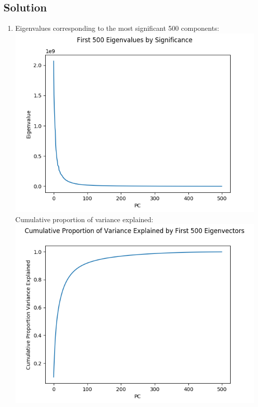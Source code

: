 \documentclass[submit]{harvardml}
\begin{document}
\subsection*{Solution}
\begin{enumerate}
    \item Eigenvalues corresponding to the most significant 500 components:\newline
    \includegraphics[scale=0.5]{hw5/Pics/2_1.png}
    \newline
    Cumulative proportion of variance explained: \newline
    \includegraphics[scale=0.5]{hw5/Pics/2_1_2.png}
    \newline
    

\end{enumerate}
\end{document}
